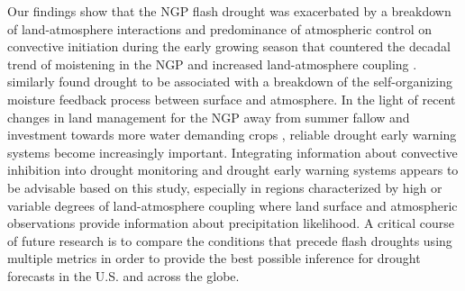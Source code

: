 \documentclass[hess, manuscript]{copernicus}
\begin{document}
\conclusions
Our findings show that the NGP flash drought was exacerbated by a breakdown of land-atmosphere interactions and predominance of atmospheric control on convective initiation during the early growing season that countered the decadal trend of moistening in the NGP and increased land-atmosphere coupling \citep{Gerken_2018}. \citet{Ruddell_2009} similarly found drought to be associated with a breakdown of the self-organizing moisture feedback process between surface and atmosphere. In the light of recent changes in land management for the NGP away from summer fallow and investment towards more water demanding crops \citep{Miller_2002, Long_2014}, reliable drought early warning systems become increasingly important. Integrating information about convective inhibition into drought monitoring and drought early warning systems appears to be advisable based on this study, especially in regions characterized by high or variable degrees of land-atmosphere coupling where land surface and atmospheric observations provide information about precipitation likelihood. A critical course of future research is to compare the conditions that precede flash droughts using multiple metrics in order to provide the best possible inference for drought forecasts in the U.S. and across the globe.












\end{document}
